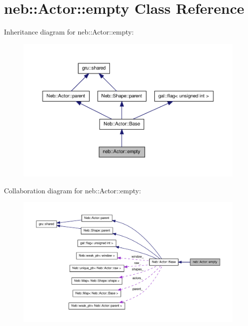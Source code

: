 \hypertarget{classneb_1_1Actor_1_1empty}{\section{neb\-:\-:\-Actor\-:\-:empty \-Class \-Reference}
\label{classneb_1_1Actor_1_1empty}
}


\-Inheritance diagram for neb\-:\-:\-Actor\-:\-:empty\-:\nopagebreak
\begin{figure}[H]
\begin{center}
\leavevmode
\includegraphics[width=350pt]{classneb_1_1Actor_1_1empty__inherit__graph}
\end{center}
\end{figure}


\-Collaboration diagram for neb\-:\-:\-Actor\-:\-:empty\-:\nopagebreak
\begin{figure}[H]
\begin{center}
\leavevmode
\includegraphics[width=350pt]{classneb_1_1Actor_1_1empty__coll__graph}
\end{center}
\end{figure}
